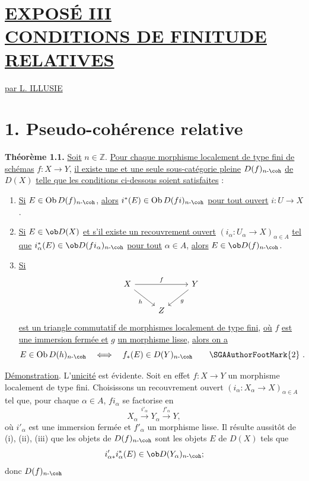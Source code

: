 \section*{\underline{EXPOSÉ III}\\[3pt] \underline{\underline{CONDITIONS DE FINITUDE RELATIVES}}}
\begin{center}
\underline{par L. ILLUSIE}
\end{center}

\section*{1. Pseudo-cohérence relative}

\textbf{Théorème 1.1.} \uline{Soit} \(n\in\mathbb Z\). \uline{Pour chaque morphisme localement de type fini de schémas} \(f:X\longrightarrow Y\), \uline{il existe une et une seule sous-catégorie pleine} \(D(f)_{n\text{-}\coh}\) \uline{de} \(D(X)\) \uline{telle que les conditions ci-dessous soient satisfaites} :
\begin{enumerate}[label=(\roman*)]
\item \uline{Si} \(E\in\operatorname{Ob} D(f)_{n\text{-}\coh}\), \uline{alors} \(i^*(E)\in\operatorname{Ob} D(fi)_{n\text{-}\coh}\) \uline{pour tout ouvert} \(i:U\to X\).

\item \uline{Si} \(E\in\ob D(X)\) \uline{et s'il existe un recouvrement ouvert} \((i_\alpha:U_\alpha\to X)_{\alpha\in A}\) \uline{tel que} \(i_\alpha^*(E)\in\ob D(fi_\alpha)_{n\text{-}\coh}\) \uline{pour tout} \(\alpha\in A\), \uline{alors} \(E\in\ob D(f)_{n\text{-}\coh}\).

\item \uline{Si}
\[
\begin{tikzcd}
X \arrow[rr,"f"] \arrow[dr,"h"'] & & Y \arrow[dl,"g"]\\
& Z &
\end{tikzcd}
\]
\uline{est un triangle commutatif de morphismes localement de type fini}, \uline{où} \(f\) \uline{est une immersion fermée et} \(g\) \uline{un morphisme lisse}, \uline{alors on a}
\[
  E\in\operatorname{Ob} D(h)_{n\text{-}\coh}
  \quad\Longleftrightarrow\quad
  f_*(E)\in D(Y)_{n\text{-}\coh}\qquad\mbox{\SGAAuthorFootMark{2}}\ .
\]
\end{enumerate}

\uline{Démonstration}. L'\uline{unicité} est évidente. Soit en effet \(f:X\to Y\) un morphisme localement de type fini. Choisissons un recouvrement ouvert \((i_\alpha:X_\alpha\to X)_{\alpha\in A}\) tel que, pour chaque \(\alpha\in A\), \(fi_\alpha\) se factorise en
\[
  X_\alpha\xrightarrow{i'_\alpha}Y_\alpha\xrightarrow{f'_\alpha}Y,
\]
où \(i'_\alpha\) est une immersion fermée et \(f'_\alpha\) un morphisme lisse. Il résulte aussitôt de (i), (ii), (iii) que les objets de \(D(f)_{n\text{-}\coh}\) sont les objets \(E\) de \(D(X)\) tels que
\[
  i'_{\alpha *}i_\alpha^*(E)\in \ob D(Y_\alpha)_{n\text{-}\coh};
\]
donc \(D(f)_{n\text{-}\coh}\) 
